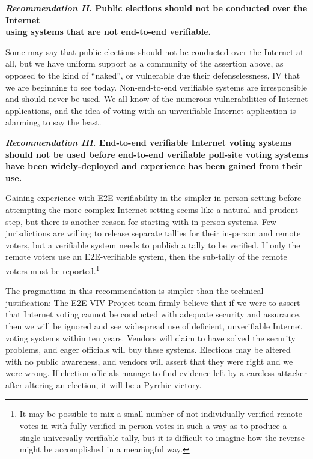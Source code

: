 \begin{center}
  \textbf{\emph{Recommendation II.} Public elections should not be
    conducted over the Internet\\
    using systems that are not end-to-end verifiable.}
\end{center}

Some may say that public elections should not be conducted over the
Internet at all, but we have uniform support as a community of the
assertion above, as opposed to the kind of ``naked'', or vulnerable due their defenselessness, IV that we are
beginning to see today. Non-end-to-end verifiable systems are
irresponsible and should never be used. We all know of the numerous
vulnerabilities of Internet applications, and the idea of voting with
an unverifiable Internet application is alarming, to say the least.

\begin{center}
  \textbf{\emph{Recommendation III.} End-to-end verifiable Internet
    voting systems should not be used before end-to-end verifiable
    poll-site voting systems have been widely-deployed and experience
    has been gained from their use.}
\end{center}

Gaining experience with E2E-verifiability in the simpler in-person
setting before attempting the more complex Internet setting seems like
a natural and prudent step, but there is another reason for starting
with in-person systems.  Few jurisdictions are willing to release
separate tallies for their in-person and remote voters, but a
verifiable system needs to publish a tally to be verified.  If only
the remote voters use an E2E-verifiable system, then the sub-tally of
the remote voters must be reported.\footnote{It may be possible to mix
  a small number of not individually-verified remote votes in with
  fully-verified in-person votes in such a way as to produce a single
  universally-verifiable tally, but it is difficult to imagine how the
  reverse might be accomplished in a meaningful way.}
 
The pragmatism in this recommendation is simpler than the technical
justification: The E2E-VIV Project team firmly believe that if we
were to assert that Internet voting cannot be conducted with adequate
security and assurance, then we will be ignored and see widespread use
of deficient, unverifiable Internet voting systems within ten years.
Vendors will claim to have solved the security problems, and eager
officials will buy these systems.  Elections may be altered with no
public awareness, and vendors will assert that they were right and we
were wrong.  If election officials manage to find
evidence left by a careless attacker after altering an election, it
will be a Pyrrhic victory.
 
